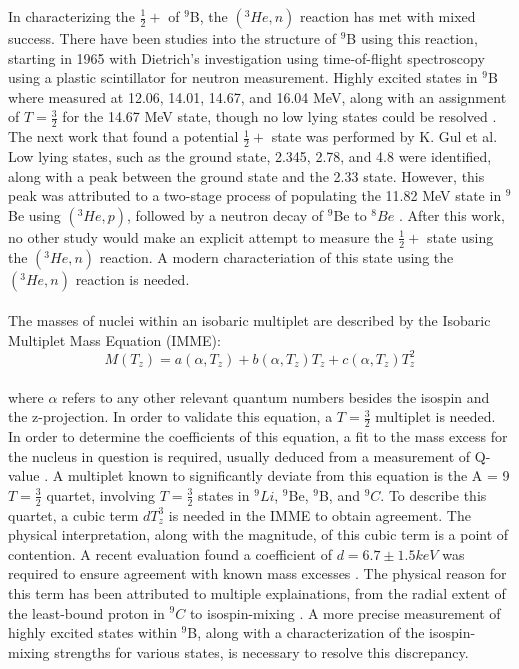 \documentclass[11pt,copyright]{fsuthesis}
\begin{document}
In characterizing the $\frac{1}{2}+$ of $^9$B, the $(^3He,n)$ reaction has met with mixed success. There have been studies into the structure of $^9$B using this reaction, starting in 1965 with Dietrich's investigation using time-of-flight spectroscopy using a plastic scintillator for neutron measurement. Highly excited states in $^9$B where measured at 12.06, 14.01, 14.67, and 16.04 MeV, along with an assignment of $T=\frac{3}{2}$ for the 14.67 MeV state, though no low lying states could be resolved \cite{DIETRICH196549}. The next work that found a potential $\frac{1}{2}+$ state was performed by K. Gul et al. Low lying states, such as the ground state, 2.345, 2.78, and 4.8 were identified, along with a peak between the ground state and the 2.33 state. However, this peak was attributed to a two-stage process of populating the 11.82 MeV state in $^9$Be using $(^3He,p)$, followed by a neutron decay of $^9$Be to $^8Be$ \cite{gul197018o}. After this work, no other study would make an explicit attempt to measure the $\frac{1}{2}+$ state using the $(^3He,n)$ reaction. A modern characteriation of this state using the $(^3He, n)$ reaction is needed.
\\ \\
The masses of nuclei within an isobaric multiplet are described by the Isobaric Multiplet Mass Equation (IMME): \\
\[
M(T_z)=a(\alpha,T_z) + b(\alpha,T_z)T_z + c(\alpha,T_z)T_z^2 \] \\
where $\alpha$ refers to any other relevant quantum numbers besides the isospin and the z-projection. In order to validate this equation, a $T=\frac{3}{2}$ multiplet is needed. In order to determine the coefficients of this equation, a fit to the mass excess for the nucleus in question is required, usually deduced from a measurement of Q-value \cite{PhysRevLett.25.530}. A multiplet known to significantly deviate from this equation is the A = 9 $T=\frac{3}{2}$ quartet, involving $T=\frac{3}{2}$ states in $^9Li$, $^9$Be, $^9$B, and $^9C$. To describe this quartet, a cubic term $dT_z^3$ is needed in the IMME to obtain agreement. The physical interpretation, along with the magnitude, of this cubic term is a point of contention. A recent evaluation found a coefficient of $d=6.7 \pm 1.5 keV$ was required to ensure agreement with known mass excesses \cite{maccormick2014evaluated}. The physical reason for this term has been attributed to multiple explainations, from the radial extent of the least-bound proton in $^9C$ \cite{bertsch1970tz3} to isospin-mixing \cite{brodeur2012elucidation}. A more precise measurement of highly excited states within $^9$B, along with a characterization of the isospin-mixing strengths for various states, is necessary to resolve this discrepancy. 
\end{document}
